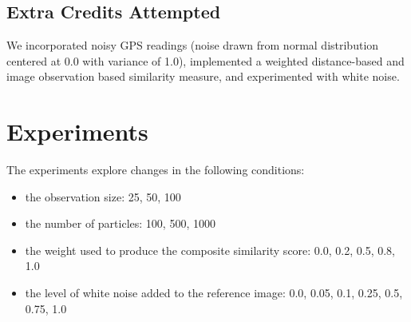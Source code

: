 \documentclass{article}
\begin{document}
\subsection{Extra Credits Attempted}
We incorporated noisy GPS readings (noise drawn from normal distribution centered at 0.0 with variance of 1.0), implemented a weighted distance-based and image observation based similarity measure, and experimented with white noise.
\section{Experiments}
The experiments explore changes in the following conditions:
\begin{itemize}
    \item the observation size: 25, 50, 100
    \item the number of particles: 100, 500, 1000
    \item the weight used to produce the composite similarity score: 0.0, 0.2, 0.5, 0.8, 1.0
    \item the level of white noise added to the reference image: 0.0, 0.05, 0.1, 0.25, 0.5, 0.75, 1.0
\end{itemize}
\end{document}
